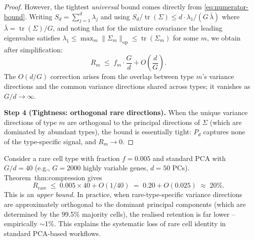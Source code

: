 \documentclass[10pt]{article}
\DeclareMathOperator{\tr}{tr}
\begin{document}
\begin{proof}
However, the tightest \emph{universal} bound comes directly from
\eqref{eq:numerator-bound}.  Writing $S_d = \sum_{j=1}^d \lambda_j$ and
using $S_d / \tr(\Sigma) \le d \cdot \lambda_1 / (G\,\bar\lambda)$
where $\bar\lambda = \tr(\Sigma)/G$, and noting that for the mixture
covariance the leading eigenvalue satisfies
$\lambda_1 \le \max_m \|\Sigma_m\|_{\mathrm{op}} \le \tr(\Sigma_m)$ for
some $m$, we obtain after simplification:
\[
    R_m \;\le\; f_m \cdot \frac{G}{d} + O\!\left(\frac{d}{G}\right).
\]
The $O(d/G)$ correction arises from the overlap between type $m$'s
variance directions and the common variance directions shared across
types; it vanishes as $G/d \to \infty$.

\medskip
\textbf{Step 4 (Tightness: orthogonal rare directions).}
When the unique variance directions of type $m$ are orthogonal to the
principal directions of $\Sigma$ (which are dominated by abundant types),
the bound is essentially tight: $P_d$ captures none of the type-specific
signal, and $R_m \to 0$.
\end{proof}

\begin{example}
\label{ex:compression}
Consider a rare cell type with fraction $f = 0.005$ and standard PCA
with $G/d = 40$ (e.g., $G = 2000$ highly variable genes, $d = 50$ PCs).
Theorem~{thm:compression} gives
\[
    R_{\mathrm{rare}} \;\le\; 0.005 \times 40 + O(1/40)
    \;=\; 0.20 + O(0.025)
    \;\approx\; 20\%.
\]
This is an \emph{upper bound}.  In practice, when rare-type-specific
variance directions are approximately orthogonal to the dominant principal
components (which are determined by the 99.5\% majority cells), the
realised retention is far lower -- empirically $\sim$1\%.  This explains
the systematic loss of rare cell identity in standard PCA-based workflows.
\end{example}

\bigskip

\end{document}
